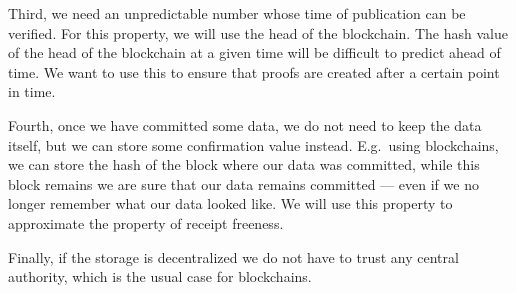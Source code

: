 Third, we need an unpredictable number whose time of publication can be 
verified.
For this property, we will use the head of the blockchain.
The hash value of the head of the blockchain at a given time will be difficult 
to predict ahead of time.
We want to use this to ensure that proofs are created after a certain point in 
time.

Fourth, once we have committed some data, we do not need to keep the data 
itself, but we can store some confirmation value instead.
E.g.\ using blockchains, we can store the hash of the block where our data was 
committed, while this block remains we are sure that our data remains committed 
--- even if we no longer remember what our data looked like.
We will use this property to approximate the property of receipt freeness.

Finally, if the storage is decentralized we do not have to trust any central 
authority, which is the usual case for blockchains.

